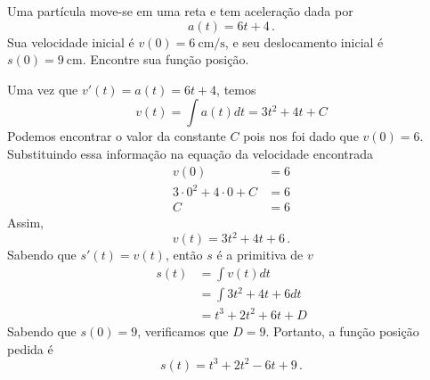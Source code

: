 \begin{example}
  Uma partícula move-se em uma reta e tem aceleração dada por
  \[
    a(t) = 6t + 4 \,.
  \]
  Sua velocidade inicial é $v(0) = \SI{6}{\centi\meter/\second}$,
  e seu deslocamento inicial é $s(0) = \SI{9}{\centi\meter}$.
  Encontre sua função posição.

  \solution
  Uma vez que \( v'(t) = a(t)=6t+4 \), temos
  \[
    v(t) = \int a(t) dt = 3t^2 + 4t + C
  \]
  Podemos encontrar o valor da constante $C$ pois nos foi dado que $v(0)=6$.
  Substituindo essa informação na equação da velocidade encontrada
  \begin{align*}
    v(0) & = 6 \\
    3 \cdot 0^2 + 4 \cdot 0 + C & = 6 \\
    C & = 6
  \end{align*}
  Assim,
  \[
    v(t) = 3t^2 + 4t + 6 \,.
  \]
  Sabendo que $s'(t)=v(t)$, então $s$ é a primitiva de $v$
  \begin{align*}
  s(t)
  & = \int v(t) dt \\[2mm]
  & = \int 3t^2 + 4t + 6 dt  \\[2mm]
  & = t^3 + 2t^2 + 6t + D
  \end{align*}
  Sabendo que $s(0) = 9$, verificamos que $D=9$.
  Portanto, a função posição pedida é
  \[
      s(t) = t^3 + 2t^2 - 6t + 9 \,.
  \]
\end{example}
